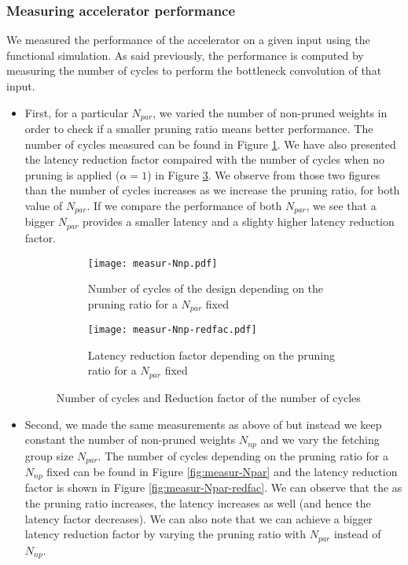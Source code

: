 \subsubsection{Measuring accelerator performance}
%
We measured the performance of the accelerator on a given input using the functional simulation. As said previously, the performance is computed by measuring the number of cycles to perform the bottleneck convolution of that input.
%
\begin{itemize}
    \item First, for a particular $N_{par}$, we varied the number of non-pruned weights in order to check if a smaller pruning ratio means better performance. The number of cycles measured can be found in Figure \ref{fig:measur-Nnp}. We have also presented the latency reduction factor compaired with the number of cycles when no pruning is applied ($\alpha = 1$) in Figure \ref{fig:measur-Nnp-redfac}. We observe from those two figures than the number of cycles increases as we increase the pruning ratio, for both value of $N_{par}$. If we compare the performance of both $N_{par}$, we see that a bigger $N_{par}$ provides a smaller latency and a slighty higher latency reduction factor.
    \begin{figure}
        \centering
        \begin{subfigure}[t]{.49\textwidth}
            \centering
            \texttt{[image: measur-Nnp.pdf]}
            \caption{Number of cycles of the design depending on the pruning ratio for a $N_{par}$ fixed}
            \label{fig:measur-Nnp}
        \end{subfigure}
        \begin{subfigure}[t]{.49\textwidth}
            \centering
            \texttt{[image: measur-Nnp-redfac.pdf]}
            \caption{Latency reduction factor depending on the pruning ratio for a $N_{par}$ fixed}
            \label{fig:measur-Nnp-redfac}
        \end{subfigure}
        \caption{Number of cycles and Reduction factor of the number of cycles}
    \end{figure}
    \item Second, we made the same measurements as above of but instead we keep constant the number of non-pruned weights $N_{np}$ and we vary the fetching group size $N_{par}$. The number of cycles depending on the pruning ratio for a $N_{np}$ fixed can be found in Figure \ref{fig:measur-Npar} and the latency reduction factor is shown in Figure \ref{fig:measur-Npar-redfac}. We can observe that the as the pruning ratio increases, the latency increases as well (and hence the latency factor decreases). We can also note that we can achieve a bigger latency reduction factor by varying the pruning ratio with $N_{par}$ instead of $N_{np}$.

\end{itemize}
